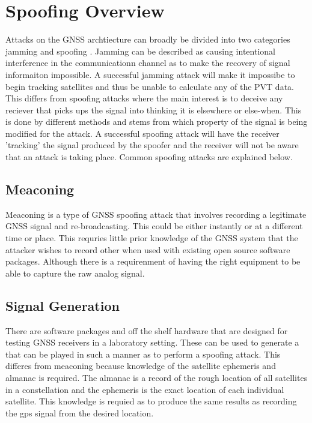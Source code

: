 \section{Spoofing Overview}
Attacks on the GNSS archtiecture can broadly be divided into two categories jamming and spoofing \cite{RN33} \cite{RN32}. Jamming can be described as causing intentional
interference in the communicationn channel as to make the recovery of signal informaiton impossible. A successful jamming attack will make it impossibe to begin tracking
satellites and thus be unable to calculate any of the PVT data. This differs from spoofing attacks where the main interest is to deceive any reciever that picks ups the
signal into thinking it is elsewhere or else-when. This is done by different methods and stems from which property of the signal is being modified for the attack. A
successful spoofing attack will have the receiver 'tracking' the signal produced by the spoofer and the receiver will not be aware that an attack is taking place. Common
spoofing attacks are explained below.

\subsection{Meaconing}
Meaconing is a type of GNSS spoofing attack that involves recording a legitimate GNSS signal and re-broadcasting. This could be either instantly or at a different time or
place. This requries little prior knowledge of the GNSS system that the attacker wishes to record other when used with existing open source software packages. Although
there is a requirenment of having the right equipment to be able to capture the raw analog signal.

\subsection{Signal Generation}
There are software packages and off the shelf hardware that are designed for testing GNSS receivers in a laboratory setting. These can be used to generate a that can be
played in such a manner as to perform a spoofing attack. This differes from meaconing because knowledge of the satellite ephemeris and almanac is required. The almanac is
a record of the rough location of all satellites in a constellation and the ephemeris is the exact location of each individual satellite. This knowledge is requied as to
produce the same results as recording the gps signal from the desired location.


